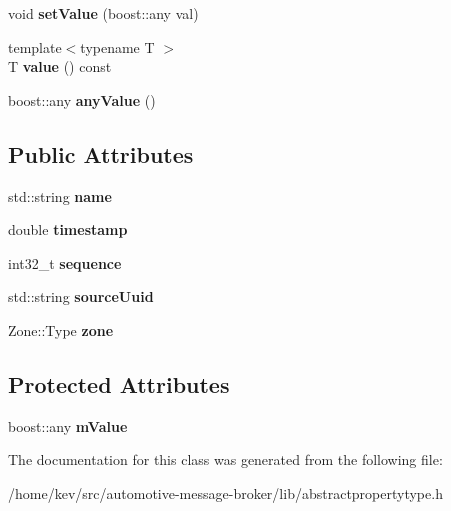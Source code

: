 \begin{DoxyCompactItemize}
\item 
\hypertarget{classAbstractPropertyType_ab0de214290dde344d367c7281d293020}{void {\bfseries set\-Value} (boost\-::any val)}\label{classAbstractPropertyType_ab0de214290dde344d367c7281d293020}

\item 
\hypertarget{classAbstractPropertyType_ae723621925382263eba046fa1ca8e36d}{{\footnotesize template$<$typename T $>$ }\\T {\bfseries value} () const }\label{classAbstractPropertyType_ae723621925382263eba046fa1ca8e36d}

\item 
\hypertarget{classAbstractPropertyType_a7ba4118acb746d2b8fc220a12b0e2666}{boost\-::any {\bfseries any\-Value} ()}\label{classAbstractPropertyType_a7ba4118acb746d2b8fc220a12b0e2666}

\end{DoxyCompactItemize}
\subsection*{Public Attributes}
\begin{DoxyCompactItemize}
\item 
\hypertarget{classAbstractPropertyType_a0899de35293963a6c18a0f4913916871}{std\-::string {\bfseries name}}\label{classAbstractPropertyType_a0899de35293963a6c18a0f4913916871}

\item 
\hypertarget{classAbstractPropertyType_a6a391546600fde38a351d3d236be8a9b}{double {\bfseries timestamp}}\label{classAbstractPropertyType_a6a391546600fde38a351d3d236be8a9b}

\item 
\hypertarget{classAbstractPropertyType_ae74440c78c4a5f6af1c3b9c85f1a34c2}{int32\-\_\-t {\bfseries sequence}}\label{classAbstractPropertyType_ae74440c78c4a5f6af1c3b9c85f1a34c2}

\item 
\hypertarget{classAbstractPropertyType_abe2de53722d28e8e7c2a715b97e1ae48}{std\-::string {\bfseries source\-Uuid}}\label{classAbstractPropertyType_abe2de53722d28e8e7c2a715b97e1ae48}

\item 
\hypertarget{classAbstractPropertyType_a420b96a1fcbcbe513ff3801185e788bc}{Zone\-::\-Type {\bfseries zone}}\label{classAbstractPropertyType_a420b96a1fcbcbe513ff3801185e788bc}

\end{DoxyCompactItemize}
\subsection*{Protected Attributes}
\begin{DoxyCompactItemize}
\item 
\hypertarget{classAbstractPropertyType_a69b5d8cd643415d4f63cd6a9e19721d9}{boost\-::any {\bfseries m\-Value}}\label{classAbstractPropertyType_a69b5d8cd643415d4f63cd6a9e19721d9}

\end{DoxyCompactItemize}


The documentation for this class was generated from the following file\-:\begin{DoxyCompactItemize}
\item 
/home/kev/src/automotive-\/message-\/broker/lib/abstractpropertytype.\-h\end{DoxyCompactItemize}
